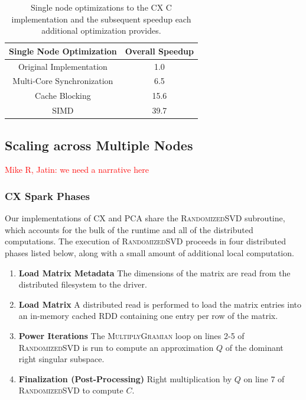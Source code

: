  
  \begin{table}
  \begin{center}
  \begin{tabular}{ |c|c| } 
  \hline
  Single Node Optimization & Overall Speedup\\
  \hline
  Original Implementation & 1.0  \\
  Multi-Core Synchronization & 6.5 \\
  Cache Blocking & 15.6 \\
  SIMD & 39.7 \\
  \hline

  \end{tabular}
  \end{center}
  \caption{Single node optimizations to the CX C implementation and
  the subsequent speedup  each additional optimization provides.}
  \label{tab:single_node}
  \end{table}
 



  \subsection{Scaling across Multiple Nodes}
  \textcolor{red}{Mike R, Jatin: we need a narrative here}

  \subsubsection{CX Spark Phases}
  Our implementations of CX and PCA share the \textsc{RandomizedSVD} subroutine, which accounts for the bulk of the runtime and all of the distributed computations.
  The execution of \textsc{RandomizedSVD} proceeds in four distributed phases listed below, along with a small amount of additional local computation.
  \begin{enumerate}
      \item \textbf{Load Matrix Metadata}
         The dimensions of the matrix are read from the distributed filesystem to the driver.
      \item \textbf{Load Matrix}
         A distributed read is performed to load the matrix entries into an in-memory cached
         RDD containing one entry per row of the matrix.
      \item \textbf{Power Iterations}
         The \textsc{MultiplyGramian} loop on lines 2-5 of
         \textsc{RandomizedSVD} is run to compute an approximation $Q$
         of the dominant right singular subspace.
       \item \textbf{Finalization (Post-Processing)}
         Right multiplication by $Q$ on line 7 of \textsc{RandomizedSVD} to compute $C$.
  \end{enumerate}

